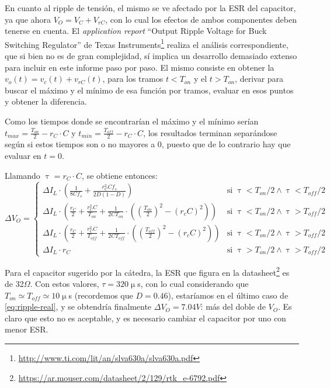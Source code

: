 \documentclass[e4_tp1_main.tex]{subfiles}
\begin{document}
En cuanto al ripple de tensi\'on, el mismo se ve afectado por la ESR del capacitor, ya que ahora $V_O = V_C + V_{rC}$, con lo cual los efectos de ambos componentes deben tenerse en cuenta. El \textit{application report} ``Output Ripple Voltage for Buck Switching Regulator'' de Texas Instruments\footnote{ 
	\url{http://www.ti.com/lit/an/slva630a/slva630a.pdf}
} realiza el an\'alisis correspondiente, que si bien no es de gran complejidad, s\'i implica un desarrollo demasiado extenso para incluir en este informe paso por paso. El mismo consiste en obtener la $v_o(t) = v_c(t) + v_{rC}(t)$, para los tramos $t<T_{on}$ y el $t>T_{on}$, derivar para buscar el m\'aximo y el m\'inimo de esa funci\'on por tramos, evaluar en esos puntos y obtener la diferencia.

Como los tiempos donde se encontrar\'ian el m\'aximo y el m\'inimo ser\'ian $t_{max} = \frac{T_{on}}{2} - r_C \cdot C$ y $t_{min} = \frac{T_{off}}{2} - r_C \cdot C$, los resultados terminan separ\'andose seg\'un si estos tiempos son o no mayores a 0, puesto que de lo contrario hay que evaluar en $t=0$. 

Llamando $\uptau = r_C \cdot C$, se obtiene entonces:
\begin{equation}
	\Delta V_O =
	\begin{cases} 
		
		\Delta I_L \cdot \left(
			\frac{1}{8Cf_s} + \frac{r_C^2 C f_s}{2D(1-D)}
		\right) 
		& \text{si }  \uptau < T_{on}/2 \wedge \uptau < T_{off}/2 \\
		
		\Delta I_L \cdot \left(
		\frac{r_C}{2} + \frac{r_C^2 C}{T_{on}} + \frac{1}{2CT_{on}} 
		\cdot \left(
			\left( \frac{T_{on}}{2} \right)^2 - (r_c C)^2
		\right)
		\right) 
		& \text{si }  \uptau < T_{on}/2 \wedge \uptau > T_{off}/2\\
		
		\Delta I_L \cdot \left(
		\frac{r_C}{2} + \frac{r_C^2 C}{T_{off}} + \frac{1}{2CT_{off}} 
		\cdot \left(
		\left( \frac{T_{off}}{2} \right)^2 - (r_c C)^2
		\right)
		\right) 
		& \text{si }  
		\uptau < T_{on}/2 \wedge \uptau > T_{off}/2\\
		
		\Delta I_L \cdot r_C & \text{si } \uptau > T_{on}/2 \wedge \uptau > T_{off}/2
		
	\end{cases}
	\label{eq:ripple-real}
\end{equation}

Para el capacitor sugerido por la c\'atedra, la ESR que figura en la datasheet\footnote{ 
	\url{https://ar.mouser.com/datasheet/2/129/rtk_e-6792.pdf}
} es de 32$\Omega$. Con estos valores, $\tau = 320\upmu$s, con lo cual considerando que $T_{on} \simeq T_{off} \simeq 10\upmu$s (recordemos que $D = 0.46$), estar\'iamos en el \'ultimo caso de \ref{eq:ripple-real}, y se obtendr\'ia finalmente $\Delta V_O = 7.04V$: m\'as del doble de $V_O$. Es claro que esto no es aceptable, y es necesario cambiar el capacitor por uno con menor ESR.
\end{document}
